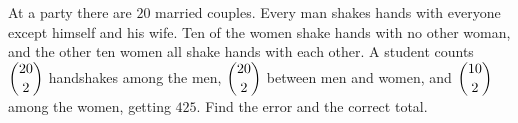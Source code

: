 At a party there are $20$ married couples. Every man shakes hands with everyone except himself and his wife. Ten of the women shake hands with no other woman, and the other ten women all shake hands with each other. A student counts $\dbinom{20}{2}$ handshakes among the men, $\dbinom{20}{2}$ between men and women, and $\dbinom{10}{2}$ among the women, getting $425$. Find the error and the correct total.
